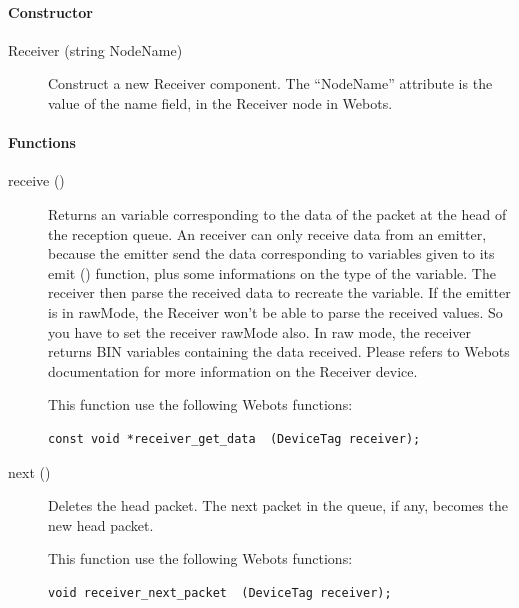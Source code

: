 \paragraph{Constructor}
\label{webots.uobjects.robotdevices.receiver.constructor}%

\noindent
\begin{description}
\item[{Receiver (string NodeName)}] Construct a new Receiver component. The ``NodeName'' attribute is the value
          of the name field, in the Receiver node in Webots.

\end{description}

\paragraph{Functions}
\label{webots.uobjects.robotdevices.receiver.functions}%

\noindent
\begin{description}
\item[{receive ()}] Returns an \urbi variable corresponding to the data
  of the packet at the head of the reception queue. An \urbi receiver
  can only receive data from an \urbi emitter, because the \urbi emitter
  send the data corresponding to \urbi variables given to its emit ()
  function, plus some informations on the type of the variable. The
  receiver then parse the received data to recreate the \urbi variable.
  If the \urbi emitter is in rawMode, the Receiver won't be able to
  parse the received values.  So you have to set the receiver rawMode
  also. In raw mode, the receiver returns BIN variables containing the
  data received.  Please refers to Webots documentation for more
  information on the Receiver device.


          This function use the following Webots functions:


\begin{lstlisting}
const void *receiver_get_data  (DeviceTag receiver);
\end{lstlisting}
\item[{next ()}]           Deletes the head packet. The next packet in the queue, if any, becomes the
           new head packet.


          This function use the following Webots functions:


\begin{lstlisting}
void receiver_next_packet  (DeviceTag receiver);
\end{lstlisting}
\end{description}

